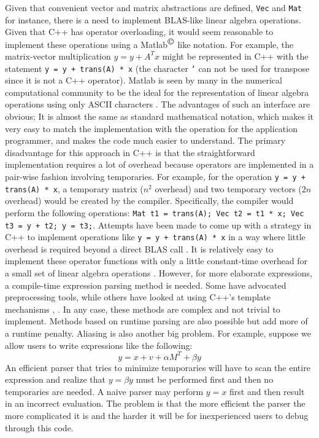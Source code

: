 \documentclass[acmtoms,acmnow]{acmtrans2m}
\begin{document}
Given that convenient vector and matrix abstractions are defined,
{}\texttt{Vec} and {}\texttt{Mat} for instance, there is a need to implement
BLAS-like linear algebra operations.  Given that C++ has operator overloading,
it would seem reasonable to implement these operations using a
Matlab${}^{\mbox{\copyright}}$ like notation.  For example, the matrix-vector
multiplication $y = y + A^T x$ might be represented in C++ with the statement
{}\texttt{y = y + trans(A) * x} (the character {}\texttt{'} can not be used
for transpose since it is not a C++ operator).  Matlab is seen by many in the
numerical computational community to be the ideal for the representation of
linear algebra operations using only ASCII characters {}\cite{ref:demmel_1997}.
The advantages of such an interface are obvious; It is almost the same as
standard mathematical notation, which makes it very easy to match the
implementation with the operation for the application programmer, and makes
the code much easier to understand.  The primary disadvantage for this
approach in C++ is that the straightforward implementation requires a lot of
overhead because operators are implemented in a pair-wise fashion involving
temporaries.  For example, for the operation {}\texttt{y = y + trans(A) * x},
a temporary matrix ($n^2$ overhead) and two temporary vectors ($2n$ overhead)
would be created by the compiler.  Specifically, the compiler would perform
the following operations: {}\texttt{Mat t1 = trans(A); Vec t2 = t1 * x; Vec t3
= y + t2; y = t3;}.  Attempts have been made to come up with a strategy in C++
to implement operations like {}\texttt{y = y + trans(A) * x} in a way where
little overhead is required beyond a direct BLAS call {}\cite{ref:parker_1997}.
It is relatively easy to implement these operator functions with only a little
constant-time overhead for a small set of linear algebra operations
\cite[pages 675-677]{ref:stroustrup_1997}.  However, for more elaborate
expressions, a compile-time expression parsing method is needed.  Some have
advocated preprocessing tools, while others have looked at using C++'s
template mechanisms {}\cite{ref:veldhuizen_et_al_1998},
{}\cite{ref:parker_1997}.  In any case, these methods are complex and not
trivial to implement.  Methods based on runtime parsing are also possible but
add more of a runtime penalty.  Aliasing is also another big problem.  For
example, suppose we allow users to write expressions like the following:
%
\[
y = x + v + \alpha M^{T} + \beta y
\]
%
An efficient parser that tries to minimize temporaries will have to scan the
entire expression and realize that $y = \beta y$ must be performed first and
then no temporaries are needed.  A naive parser may perform $y = x$ first and
then result in an incorrect evaluation.  The problem is that the more
efficient the parser the more complicated it is and the harder it will be for
inexperienced users to debug through this code.
\end{document}
